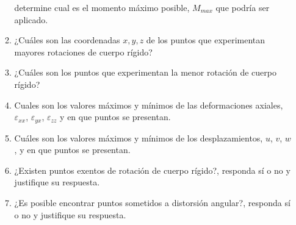 \documentclass[../notas medios.tex]{subfiles}
\begin{document}
\begin{enumerate}
\begin{enumerate}
determine cual es el momento máximo posible, $M_{max}$ que podría ser aplicado. 
\item¿Cu\'ales son las coordenadas $x,y,z$ de los puntos que experimentan mayores rotaciones de cuerpo r\'igido?
\item ¿Cu\'ales son los puntos que experimentan la menor rotaci\'on de cuerpo r\'igido? 
\item Cuales son los valores máximos y mínimos de las deformaciones axiales, 
$\varepsilon_{xx}$, $\varepsilon_{yx}$, $\varepsilon_{zz}$ y en que puntos se 
presentan.
\item Cu\'ales son los valores máximos y mínimos de los desplazamientos, $u$, 
$v$, $w$, y en que puntos se presentan.
\item ¿Existen puntos exentos de rotaci\'on de cuerpo r\'igido?, responda s\'i o no y justifique su respuesta.
\item ¿Es posible encontrar puntos sometidos a distorsión angular?, responda 
s\'i o no y justifique su respuesta.
%
\end{enumerate}


\end{enumerate}
\end{document}
